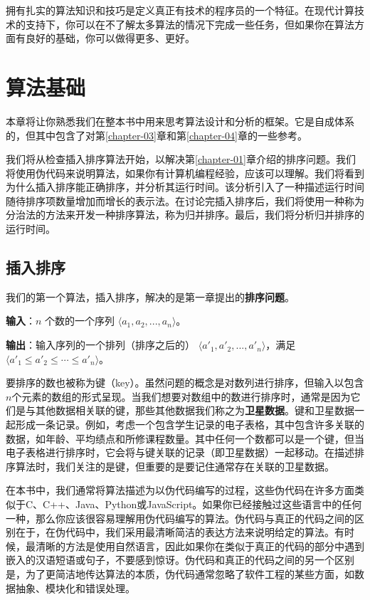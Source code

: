 \documentclass[lang=cn,newtx,10pt,scheme=chinese]{elegantbook}
\begin{document}
拥有扎实的算法知识和技巧是定义真正有技术的程序员的一个特征。在现代计算技术的支持下，你可以在不了解太多算法的情况下完成一些任务，但如果你在算法方面有良好的基础，你可以做得更多、更好。

\chapter{算法基础}\label{chapter-02}

本章将让你熟悉我们在整本书中用来思考算法设计和分析的框架。它是自成体系的，但其中包含了对第\ref{chapter-03}章和第\ref{chapter-04}章的一些参考。

我们将从检查插入排序算法开始，以解决第\ref{chapter-01}章介绍的排序问题。我们将使用伪代码来说明算法，如果你有计算机编程经验，应该可以理解。我们将看到为什么插入排序能正确排序，并分析其运行时间。该分析引入了一种描述运行时间随待排序项数量增加而增长的表示法。在讨论完插入排序后，我们将使用一种称为分治法的方法来开发一种排序算法，称为归并排序。最后，我们将分析归并排序的运行时间。

\section{插入排序}\label{section-2.1}

我们的第一个算法，插入排序，解决的是第一章提出的\textbf{排序问题}。

\textbf{输入}：$n$ 个数的一个序列 $\langle a_1, a_2, ..., a_n\rangle$。

\textbf{输出}：输入序列的一个排列（排序之后的） $\langle{a'_1,a'_2,...,a'_n}\rangle$，满足$\langle{a'_1\le a'_2\le \cdots\le a'_n}\rangle$。

要排序的数也被称为键（key）。虽然问题的概念是对数列进行排序，但输入以包含$n$个元素的数组的形式呈现。当我们想要对数组中的数进行排序时，通常是因为它们是与其他数据相关联的键，那些其他数据我们称之为\textbf{卫星数据}。键和卫星数据一起形成一条记录。例如，考虑一个包含学生记录的电子表格，其中包含许多关联的数据，如年龄、平均绩点和所修课程数量。其中任何一个数都可以是一个键，但当电子表格进行排序时，它会将与键关联的记录（即卫星数据）一起移动。在描述排序算法时，我们关注的是键，但重要的是要记住通常存在关联的卫星数据。

在本书中，我们通常将算法描述为以伪代码编写的过程，这些伪代码在许多方面类似于C、C++、Java、Python或JavaScript。如果你已经接触过这些语言中的任何一种，那么你应该很容易理解用伪代码编写的算法。伪代码与真正的代码之间的区别在于，在伪代码中，我们采用最清晰简洁的表达方法来说明给定的算法。有时候，最清晰的方法是使用自然语言，因此如果你在类似于真正的代码的部分中遇到嵌入的汉语短语或句子，不要感到惊讶。伪代码和真正的代码之间的另一个区别是，为了更简洁地传达算法的本质，伪代码通常忽略了软件工程的某些方面，如数据抽象、模块化和错误处理。
\end{document}
